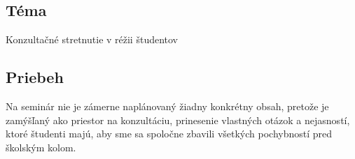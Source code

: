 

\subsection*{Téma}
Konzultačné stretnutie v réžii študentov

\subsection*{Priebeh}

Na seminár nie je zámerne naplánovaný žiadny konkrétny obsah, pretože je zamýšľaný ako priestor na konzultáciu, prinesenie vlastných otázok a nejasností, ktoré študenti majú, aby sme sa spoločne zbavili všetkých pochybností pred školským kolom.


